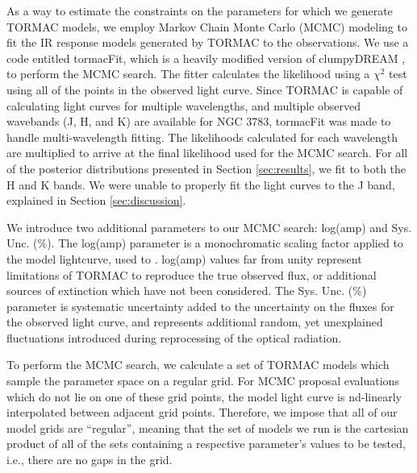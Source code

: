 As a way to estimate the constraints on the parameters for which we generate TORMAC models, we employ Markov Chain Monte Carlo (MCMC) modeling to fit the IR response models generated by TORMAC to the observations. We use a code entitled tormacFit, which is a heavily modified version of clumpyDREAM \citep{sales_embedded_2015}, to perform the MCMC search.  The fitter calculates the likelihood using a $\chi^2$ test using all of the points in the observed light curve.  Since TORMAC is capable of calculating light curves for multiple wavelengths, and multiple observed wavebands (J, H, and K) are available for NGC 3783, tormacFit was made to handle multi-wavelength fitting. The likelihoods calculated for each wavelength are multiplied to arrive at the final likelihood used for the MCMC search.  For all of the posterior distributions presented in Section \ref{sec:results}, we fit to both the H and K bands. We were unable to properly fit the light curves to the J band, explained in Section \ref{sec:discussion}. 

We introduce two additional parameters to our MCMC search: log(amp) and Sys. Unc. (\%). The log(amp) parameter is a monochromatic scaling factor applied to the model lightcurve, used to . log(amp) values far from unity represent limitations of TORMAC to reproduce the true observed flux, or additional sources of extinction which have not been considered. The Sys. Unc. (\%) parameter is systematic uncertainty added to the uncertainty on the fluxes for the observed light curve, and represents additional random, yet unexplained fluctuations introduced during reprocessing of the optical radiation. 

To perform the MCMC search, we calculate a set of TORMAC models which sample the parameter space on a regular grid. For MCMC proposal evaluations which do not lie on one of these grid points, the model light curve is nd-linearly interpolated between adjacent grid points. Therefore, we impose that all of our model grids are “regular”, meaning that the set of models we run is the cartesian product of all of the sets containing a respective parameter’s values to be tested, i.e., there are no gaps in the grid. 